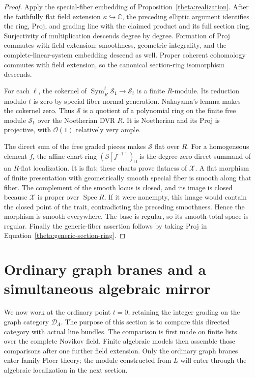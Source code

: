 \documentclass[11pt]{article}
\theoremstyle{definition}
\theoremstyle{remark}
\numberwithin{equation}{section}
\begin{document}
\begin{proof}
Apply the special-fiber embedding of
Proposition~\ref{theta:realization}.  After the faithfully flat field
extension $\kappa\hookrightarrow\mathbb C$, the preceding elliptic argument
identifies the ring, Proj, and grading line with the claimed product
and its full section ring.  Surjectivity of multiplication descends
degree by degree.  Formation of Proj commutes with field extension;
smoothness, geometric integrality, and the complete-linear-system
embedding descend as well.  Proper coherent cohomology commutes with
field extension, so the canonical section-ring isomorphism descends.

For each $\ell$, the cokernel of
$\operatorname{Sym}^\ell_R\mathscr S_1\to\mathscr S_\ell$ is a finite
$R$-module.  Its reduction modulo $t$ is zero by special-fiber normal
generation.  Nakayama's lemma makes the cokernel zero.  Thus $\mathscr S$
is a quotient of a polynomial ring on the finite free module
$\mathscr S_1$ over the Noetherian DVR $R$.  It is Noetherian and its
Proj is projective, with $\mathcal O(1)$ relatively very ample.

The direct sum of the free graded pieces makes $\mathscr S$ flat over
$R$.  For a homogeneous element $f$, the affine chart ring
$(\mathscr S[f^{-1}])_0$ is the degree-zero direct summand of an
$R$-flat localization.  It is flat; these charts prove flatness of
$\mathscr X$.  A flat morphism of finite presentation with geometrically
smooth special fiber is smooth along that fiber.  The complement of
the smooth locus is closed, and its image is closed because $\mathscr X$
is proper over $\operatorname{Spec} R$.  If it were nonempty, this image would contain
the closed point of the trait, contradicting the preceding smoothness.
Hence the morphism is smooth everywhere.  The base is regular, so its
smooth total space is regular.  Finally the generic-fiber assertion
follows by taking Proj in Equation~\eqref{theta:generic-section-ring}.
\end{proof}

\section{Ordinary graph branes and a simultaneous algebraic mirror}
\label{mirror:section}

We now work at the ordinary point $t=0$, retaining the integer grading
on the graph category $\mathcal D_\Lambda$.  The purpose of this section
is to compare this directed category with actual line bundles.  The
comparison is first made on finite lists over the complete Novikov
field.  Finite algebraic models then assemble those comparisons after
one further field extension.  Only the ordinary graph branes enter
family Floer theory; the module constructed from $L$ will enter through
the algebraic localization in the next section.
\end{document}

